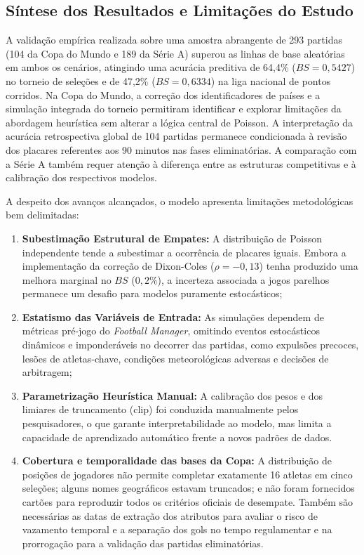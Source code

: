 \documentclass[12pt]{article}
\begin{document}
\subsection{Síntese dos Resultados e Limitações do Estudo}

A validação empírica realizada sobre uma amostra abrangente de 293 partidas (104 da Copa do Mundo e 189 da Série A) superou as linhas de base aleatórias em ambos os cenários, atingindo uma acurácia preditiva de 64,4\% ($BS = 0{,}5427$) no torneio de seleções e de 47,2\% ($BS = 0{,}6334$) na liga nacional de pontos corridos. Na Copa do Mundo, a correção dos identificadores de países e a simulação integrada do torneio permitiram identificar e explorar limitações da abordagem heurística sem alterar a lógica central de Poisson. A interpretação da acurácia retrospectiva global de 104 partidas permanece condicionada à revisão dos placares referentes aos 90 minutos nas fases eliminatórias. A comparação com a Série A também requer atenção à diferença entre as estruturas competitivas e à calibração dos respectivos modelos.

A despeito dos avanços alcançados, o modelo apresenta limitações metodológicas bem delimitadas:
\begin{enumerate}
	\item \textbf{Subestimação Estrutural de Empates:} A distribuição de Poisson independente tende a subestimar a ocorrência de placares iguais. Embora a implementação da correção de Dixon-Coles ($\rho = -0{,}13$) tenha produzido uma melhora marginal no $BS$ ($0{,}2\%$), a incerteza associada a jogos parelhos permanece um desafio para modelos puramente estocásticos;
	\item \textbf{Estatismo das Variáveis de Entrada:} As simulações dependem de métricas pré-jogo do \textit{Football Manager}, omitindo eventos estocásticos dinâmicos e imponderáveis no decorrer das partidas, como expulsões precoces, lesões de atletas-chave, condições meteorológicas adversas e decisões de arbitragem;
	\item \textbf{Parametrização Heurística Manual:} A calibração dos pesos e dos limiares de truncamento ($\mathrm{clip}$) foi conduzida manualmente pelos pesquisadores, o que garante interpretabilidade ao modelo, mas limita a capacidade de aprendizado automático frente a novos padrões de dados.
 \item \textbf{Cobertura e temporalidade das bases da Copa:} A distribuição de posições de jogadores não permite completar exatamente 16 atletas em cinco seleções; alguns nomes geográficos estavam truncados; e não foram fornecidos cartões para reproduzir todos os critérios oficiais de desempate. Também são necessárias as datas de extração dos atributos para avaliar o risco de vazamento temporal e a separação dos gols no tempo regulamentar e na prorrogação para a validação das partidas eliminatórias.
\end{enumerate}
\end{document}
